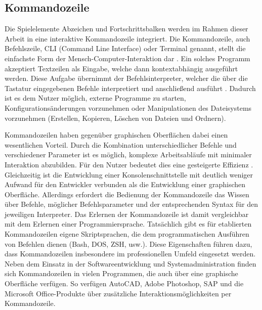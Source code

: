 \subsection{Kommandozeile}
Die Spielelemente Abzeichen und Fortschrittsbalken werden im Rahmen dieser Arbeit in eine interaktive Kommandozeile integriert. Die Kommandozeile, auch Befehlszeile, CLI (Command Line Interface) oder Terminal genannt, stellt die einfachste Form der Mensch-Computer-Interaktion dar \cite{Kumar2005}. Ein solches Programm akzeptiert Textzeilen als Eingabe, welche dann kontextabhängig ausgeführt werden. Diese Aufgabe übernimmt der Befehlsinterpreter, welcher die über die Tastatur eingegebenen Befehle interpretiert und anschließend ausführt \cite{wissen_interpreter}. 
Dadurch ist es dem Nutzer möglich, externe Programme zu starten, Konfigurationsänderungen vorzunehmen oder Manipulationen des Dateisystems vorzunehmen (Erstellen, Kopieren, Löschen von Dateien und Ordnern).

Kommandozeilen haben gegenüber graphischen Oberflächen dabei einen wesentlichen Vorteil. Durch die Kombination unterschiedlicher Befehle und verschiedener Parameter ist es möglich, komplexe Arbeitsabläufe mit minimaler Interaktion abzubilden. Für den Nutzer bedeutet dies eine gesteigerte Effizienz \cite{Kumar2005}. Gleichzeitig ist die Entwicklung einer Konsolenschnittstelle mit deutlich weniger Aufwand für den Entwickler verbunden als die Entwicklung einer graphischen Oberfläche. Allerdings erfordert die Bedienung der Kommandozeile das Wissen über Befehle, möglicher Befehlsparameter und der entsprechenden Syntax für den jeweiligen Interpreter. Das Erlernen der Kommandozeile ist damit vergleichbar mit dem Erlernen einer Programmiersprache. Tatsächlich gibt es für etablierten Kommandozeilen eigene Skriptsprachen, die dem programmatischen Ausführen von Befehlen dienen (Bash, DOS, ZSH, usw.). Diese Eigenschaften führen dazu, dass Kommandozeilen insbesondere im professionellen Umfeld eingesetzt werden. Neben dem Einsatz in der Softwareentwicklung und Systemadministration finden sich Kommandozeilen in vielen Programmen, die auch über eine graphische Oberfläche verfügen. So verfügen AutoCAD, Adobe Photoshop, SAP und die Microsoft Office-Produkte über zusätzliche Interaktionsmöglichkeiten per Kommandozeile.




